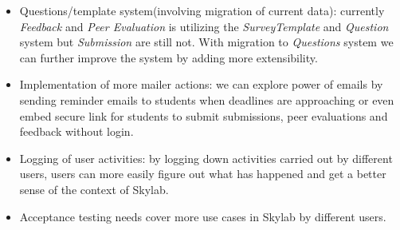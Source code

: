 \begin{itemize}
  \item Questions/template system(involving migration of current data): currently \textit{Feedback} and \textit{Peer Evaluation} is utilizing the \textit{SurveyTemplate} and \textit{Question} system but \textit{Submission} are still not. With migration to \textit{Questions} system we can further improve the system by adding more extensibility.
  \item Implementation of more mailer actions: we can explore power of emails by sending reminder emails to students when deadlines are approaching or even embed secure link for students to submit submissions, peer evaluations and feedback without login.
  \item Logging of user activities: by logging down activities carried out by different users, users can more easily figure out what has happened and get a better sense of the context of Skylab.
  \item Acceptance testing needs cover more use cases in Skylab by different users.
\end{itemize}

